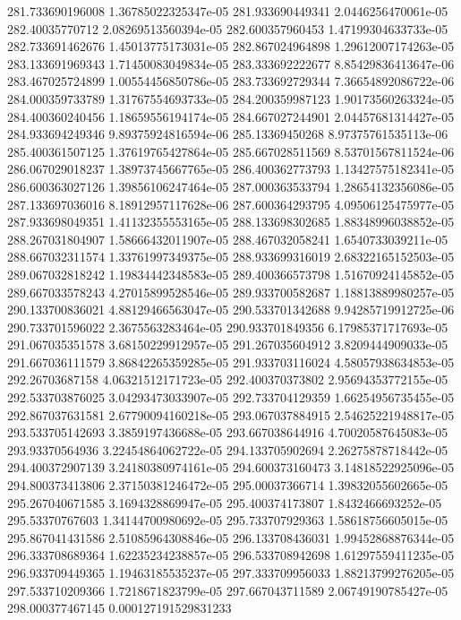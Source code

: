{281.733690196008 1.36785022325347e-05
281.933690449341 2.0446256470061e-05
282.40035770712 2.08269513560394e-05
282.600357960453 1.47199304633733e-05
282.733691462676 1.45013775173031e-05
282.867024964898 1.29612007174263e-05
283.133691969343 1.71450083049834e-05
283.333692222677 8.85429836413647e-06
283.467025724899 1.00554456850786e-05
283.733692729344 7.36654892086722e-06
284.000359733789 1.31767554693733e-05
284.200359987123 1.90173560263324e-05
284.400360240456 1.18659556194174e-05
284.667027244901 2.04457681314427e-05
284.933694249346 9.89375924816594e-06
285.13369450268 8.97375761535113e-06
285.400361507125 1.37619765427864e-05
285.667028511569 8.53701567811524e-06
286.067029018237 1.38973745667765e-05
286.400362773793 1.13427575182341e-05
286.600363027126 1.39856106247464e-05
287.000363533794 1.28654132356086e-05
287.133697036016 8.18912957117628e-06
287.600364293795 4.09506125475977e-05
287.933698049351 1.41132355553165e-05
288.133698302685 1.88348996038852e-05
288.267031804907 1.58666432011907e-05
288.467032058241 1.6540733039211e-05
288.667032311574 1.33761997349375e-05
288.933699316019 2.68322165152503e-05
289.067032818242 1.19834442348583e-05
289.400366573798 1.51670924145852e-05
289.667033578243 4.27015899528546e-05
289.933700582687 1.18813889980257e-05
290.133700836021 4.88129466563047e-05
290.533701342688 9.94285719912725e-06
290.733701596022 2.3675563283464e-05
290.933701849356 6.17985371717693e-05
291.067035351578 3.68150229912957e-05
291.267035604912 3.8209444909033e-05
291.667036111579 3.86842265359285e-05
291.933703116024 4.58057938634853e-05
292.26703687158 4.06321512171723e-05
292.400370373802 2.95694353772155e-05
292.533703876025 3.04293473033907e-05
292.733704129359 1.66254956735455e-05
292.867037631581 2.67790094160218e-05
293.067037884915 2.54625221948817e-05
293.533705142693 3.3859197436688e-05
293.667038644916 4.70020587645083e-05
293.93370564936 3.22454864062722e-05
294.133705902694 2.26275878718442e-05
294.400372907139 3.24180380974161e-05
294.600373160473 3.14818522925096e-05
294.800373413806 2.37150381246472e-05
295.00037366714 1.39832055602665e-05
295.267040671585 3.1694328869947e-05
295.400374173807 1.8432466693252e-05
295.53370767603 1.34144700980692e-05
295.733707929363 1.58618756605015e-05
295.867041431586 2.51085964308846e-05
296.133708436031 1.99452868876344e-05
296.333708689364 1.62235234238857e-05
296.533708942698 1.61297559411235e-05
296.933709449365 1.19463185535237e-05
297.333709956033 1.88213799276205e-05
297.533710209366 1.7218671823799e-05
297.667043711589 2.06749190785427e-05
298.000377467145 0.000127191529831233
}
